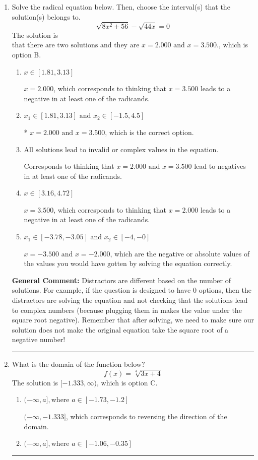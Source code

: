 \documentclass{extbook}[14pt]
\newcommand{\litem}[1]{\item #1

\rule{\textwidth}{0.4pt}}
\begin{document}
\begin{enumerate}\litem{
Solve the radical equation below. Then, choose the interval(s) that the solution(s) belongs to.
\[ \sqrt{8 x^2 + 56} - \sqrt{44 x} = 0 \]The solution is \( \text{that there are two solutions and they are } x = 2.000 \text{ and } x = 3.500. \), which is option B.\begin{enumerate}[label=\Alph*.]
\item \( x \in [1.81,3.13] \)

$x = 2.000$, which corresponds to thinking that $x = 3.500$ leads to a negative in at least one of the radicands.
\item \( x_1 \in [1.81, 3.13] \text{ and } x_2 \in [-1.5,4.5] \)

* $x = 2.000 \text{ and } x = 3.500$, which is the correct option.
\item \( \text{All solutions lead to invalid or complex values in the equation.} \)

Corresponds to thinking that $x = 2.000 \text{ and } x = 3.500$ lead to negatives in at least one of the radicands.
\item \( x \in [3.16,4.72] \)

$x = 3.500$, which corresponds to thinking that $x = 2.000$ leads to a negative in at least one of the radicands.
\item \( x_1 \in [-3.78, -3.05] \text{ and } x_2 \in [-4,-0] \)

$x = -3.500 \text{ and } x = -2.000$, which are the negative or absolute values of the values you would have gotten by solving the equation correctly.
\end{enumerate}

\textbf{General Comment:} Distractors are different based on the number of solutions. For example, if the question is designed to have 0 options, then the distractors are solving the equation and not checking that the solutions lead to complex numbers (because plugging them in makes the value under the square root negative). Remember that after solving, we need to make sure our solution does not make the original equation take the square root of a negative number!
}
\litem{
What is the domain of the function below?
\[ f(x) = \sqrt[4]{3 x + 4} \]The solution is \( [-1.333, \infty) \), which is option C.\begin{enumerate}[label=\Alph*.]
\item \( (-\infty, a], \text{where } a \in [-1.73, -1.2] \)

 $(-\infty, -1.333]$, which corresponds to reversing the direction of the domain.
\item \( (-\infty, a], \text{where } a \in [-1.06, -0.35] \)


\end{enumerate}}
\end{enumerate}
\end{document}
